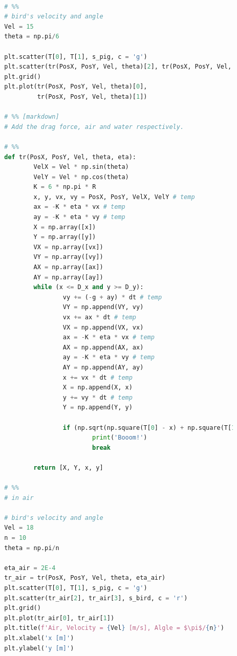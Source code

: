 \documentclass[12pt]{article}
\begin{document}
\begin{lstlisting}[language={Python}]
        
        # %%
        # bird's velocity and angle
        Vel = 15
        theta = np.pi/6
        
        plt.scatter(T[0], T[1], s_pig, c = 'g')
        plt.scatter(tr(PosX, PosY, Vel, theta)[2], tr(PosX, PosY, Vel, theta)[3], s_bird, c = 'r')
        plt.grid()
        plt.plot(tr(PosX, PosY, Vel, theta)[0], 
                 tr(PosX, PosY, Vel, theta)[1])
        
        # %% [markdown]
        # Add the drag force, air and water respectively.
        
        # %%
        def tr(PosX, PosY, Vel, theta, eta):
                VelX = Vel * np.sin(theta)
                VelY = Vel * np.cos(theta)
                K = 6 * np.pi * R
                x, y, vx, vy = PosX, PosY, VelX, VelY # temp
                ax = -K * eta * vx # temp
                ay = -K * eta * vy # temp
                X = np.array([x])
                Y = np.array([y])
                VX = np.array([vx])
                VY = np.array([vy])
                AX = np.array([ax])
                AY = np.array([ay])
                while (x <= D_x and y >= D_y):
                        vy += (-g + ay) * dt # temp
                        VY = np.append(VY, vy)
                        vx += ax * dt # temp
                        VX = np.append(VX, vx)
                        ax = -K * eta * vx # temp
                        AX = np.append(AX, ax)
                        ay = -K * eta * vy # temp
                        AY = np.append(AY, ay)
                        x += vx * dt # temp
                        X = np.append(X, x)
                        y += vy * dt # temp
                        Y = np.append(Y, y)
                        
                        if (np.sqrt(np.square(T[0] - x) + np.square(T[1] - y)) <= PosSec):
                                print('Booom!')
                                break
                        
                return [X, Y, x, y]
        
        # %%
        # in air 
        
        # bird's velocity and angle
        Vel = 18
        n = 10
        theta = np.pi/n
        
        eta_air = 2E-4
        tr_air = tr(PosX, PosY, Vel, theta, eta_air)
        plt.scatter(T[0], T[1], s_pig, c = 'g')
        plt.scatter(tr_air[2], tr_air[3], s_bird, c = 'r')
        plt.grid()
        plt.plot(tr_air[0], tr_air[1])
        plt.title(f'Air, Velocity = {Vel} [m/s], Algle = $\pi$/{n}')
        plt.xlabel('x [m]')
        plt.ylabel('y [m]')
        

\end{lstlisting}
\end{document}

